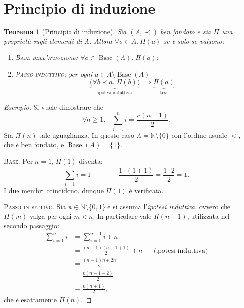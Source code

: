 \documentclass[a4paper, 11pt, oneside]{book}
\theoremstyle{formale}
\newtheorem{theorem}{Teorema}
\newenvironment{esempio}
    {\begin{proof}[\textit{Esempio}]\renewcommand{\qedsymbol}{$\diamond$}}
    {\end{proof}}
\begin{document}
    \section{Principio di induzione}
    \begin{theorem}[Principio di induzione]
        \label{thm:induzione}
        Sia $(A, \prec)$ ben fondato e sia $\Pi$ una propriet\`a sugli elementi di $A$.
        Allora $\forall a \in A.\; \Pi(a)$ se e solo se valgono:
        \begin{enumerate}[label=\textup{(\alph*)}]
            \item \textup{\textsc{Base dell'induzione}}: $\forall a \in
                \operatorname{Base}(A).\; \Pi(a)$;
            \item \textup{\textsc{Passo induttivo}}: per ogni
                $a \in A \setminus \operatorname{Base}(A)$
                \begin{equation*}
                    \underbrace{\bigl(\forall b \prec a.\; \Pi(b)\bigr)}_{\text{ipotesi
                    induttiva}}
                    \implies
                    \underbrace{\Pi(a)}_{\text{tesi}}
                \end{equation*}
        \end{enumerate}
    \end{theorem}

    \begin{esempio}
        Si vuole dimostrare che
        \begin{equation*}
            \forall n \geq 1. \quad \sum_{i=1}^{n} i = \frac{n(n+1)}{2}.
        \end{equation*}
        Sia $\Pi(n)$ tale uguaglianza. In questo caso $A = \mathbb{N} \setminus \{0\}$ con
        l'ordine usuale $<$, che \`e ben fondato, e $\operatorname{Base}(A) = \{1\}$.

        \textsc{Base}. Per $n = 1$, $\Pi(1)$ diventa:
        \begin{equation*}
            \sum_{i=1}^{1} i = 1
            \qquad\qquad
            \frac{1 \cdot (1 + 1)}{2} = \frac{1 \cdot 2}{2} = 1.
        \end{equation*}
        I due membri coincidono, dunque $\Pi(1)$ \`e verificata.

        \textsc{Passo induttivo}. Sia $n \in \mathbb{N} \setminus \{0, 1\}$ e si assuma
        l'\emph{ipotesi induttiva}, ovvero che $\Pi(m)$ valga per ogni $m < n$. In
        particolare vale $\Pi(n - 1)$, utilizzata nel secondo passaggio:
        \begin{align*}
            \sum_{i=1}^{n} i
                &= \sum_{i=1}^{n-1} i + n \\
                &= \frac{(n-1)(n-1+1)}{2} + n && \text{(ipotesi induttiva)} \\
                &= \frac{(n-1)n + 2n}{2} \\
                &= \frac{n(n-1+2)}{2} \\
                &= \frac{n(n+1)}{2},
        \end{align*}
        che \`e esattamente $\Pi(n)$.
    \end{esempio}
\end{document}
